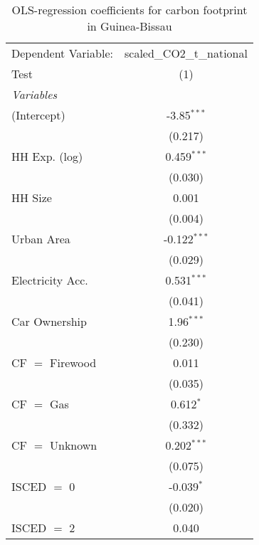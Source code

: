 
\begin{table}[htbp!]
   \centering
   \small
   \begin{adjustbox}{width = 1\textwidth, max height = 0.95\textheight, center}
      \begin{threeparttable}[b]
         \caption{\label{tab:OLS_2_GNB} OLS-regression coefficients for carbon footprint in Guinea-Bissau}
         \begin{tabular}{lc}
            \tabularnewline \midrule \midrule
            Dependent Variable: & scaled\_CO2\_t\_national\\     
            Test                & (1)\\  
            \midrule
            \emph{Variables}\\
            (Intercept)         & -3.85$^{***}$\\   
                                & (0.217)\\   
            HH Exp. (log)       & 0.459$^{***}$\\   
                                & (0.030)\\   
            HH Size             & 0.001\\   
                                & (0.004)\\   
            Urban Area          & -0.122$^{***}$\\   
                                & (0.029)\\   
            Electricity Acc.    & 0.531$^{***}$\\   
                                & (0.041)\\   
            Car Ownership       & 1.96$^{***}$\\   
                                & (0.230)\\   
            CF $=$ Firewood     & 0.011\\   
                                & (0.035)\\   
            CF $=$ Gas          & 0.612$^{*}$\\   
                                & (0.332)\\   
            CF $=$ Unknown      & 0.202$^{***}$\\   
                                & (0.075)\\   
            ISCED $=$ 0         & -0.039$^{*}$\\   
                                & (0.020)\\   
            ISCED $=$ 2         & 0.040\\   

\end{tabular}
\end{threeparttable}
\end{adjustbox}
\end{table}
